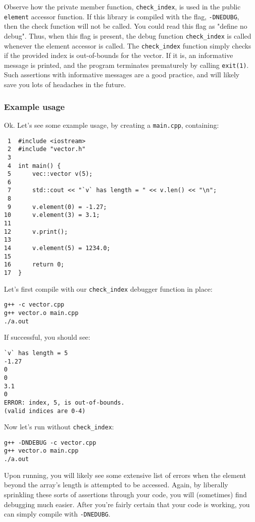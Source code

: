 \documentclass[11pt]{article}
\begin{document}
Observe how the private member function, \texttt{check\_index}, is used in the 
public \texttt{element} accessor function. If this library is compiled with the 
flag, \texttt{-DNEDUBG}, then the check function will not be called. You could 
read this flag as "define no debug". Thus, when this flag is present, the 
debug function \texttt{check\_index} is called whenever the element accessor is 
called. The \texttt{check\_index} function simply checks if the provided index is 
out-of-bounds for the vector. If it is, an informative message is printed, 
and the program terminates prematurely by calling \texttt{exit(1)}. Such assertions 
with informative messages are a good practice, and will likely save you lots 
of headaches in the future.

\subsubsection{Example usage}
\label{sec:orgheadline51}
Ok. Let's see some example usage, by creating a \texttt{main.cpp}, containing:

\begin{verbatim}
 1  #include <iostream>
 2  #include "vector.h"
 3  
 4  int main() {
 5      vec::vector v(5);
 6  
 7      std::cout << "`v` has length = " << v.len() << "\n";
 8  
 9      v.element(0) = -1.27;
10      v.element(3) = 3.1;
11  
12      v.print();
13  
14      v.element(5) = 1234.0;
15  
16      return 0;
17  }
\end{verbatim}

Let's first compile with our \texttt{check\_index} debugger function in place:

\begin{verbatim}
g++ -c vector.cpp
g++ vector.o main.cpp
./a.out
\end{verbatim}

If successful, you should see:

\begin{verbatim}
`v` has length = 5
-1.27
0
0
3.1
0
ERROR: index, 5, is out-of-bounds.
(valid indices are 0-4)
\end{verbatim}

Now let's run without \texttt{check\_index}:

\begin{verbatim}
g++ -DNDEBUG -c vector.cpp
g++ vector.o main.cpp
./a.out
\end{verbatim}

Upon running, you will likely see some extensive list of errors when 
the element beyond the array's length is attempted to be accessed. Again, 
by liberally sprinkling these sorts of assertions through your code, you 
will (sometimes) find debugging much easier. After you're fairly certain 
that your code is working, you can simply compile with \texttt{-DNEDUBG}.
\end{document}
